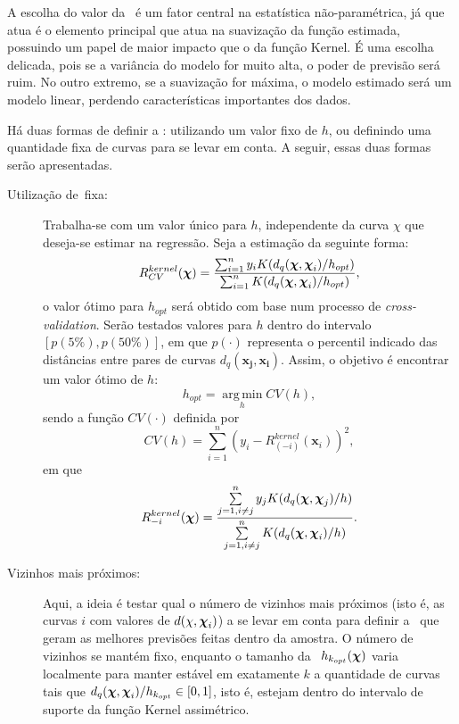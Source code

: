 \documentclass[
	12pt,				%
	openright,			%
	oneside,			%
	a4paper,			%
	english,			%
	brazil				%
	]{dissertacao-ufrgs-abntex2}
\begin{document}
A escolha do valor da \bw~é um fator central na estatística não-paramétrica, já que atua é o elemento principal que atua na suavização da função estimada, possuindo um papel de maior impacto que o da função Kernel. É uma escolha delicada, pois se a variância do modelo for muito alta, o poder de previsão será ruim. No outro extremo, se a suavização for máxima, o modelo estimado será um modelo linear, perdendo características importantes dos dados.

Há duas formas de definir a \bw: utilizando um valor fixo de $h$, ou definindo uma quantidade fixa de curvas para se levar em conta. A seguir, essas duas formas serão apresentadas.

\begin{description}

\item[Utilização de \bw \,fixa:]

Trabalha-se com um valor único para $h$, independente da curva $\chi$ que deseja-se estimar na regressão. Seja a estimação da seguinte forma:
\[
R_{CV}^{kernel}(\boldsymbol{\chi})=\dfrac{\sum_{i=1}^{n}y_{i}K(d_{q}(\boldsymbol{\chi},\boldsymbol{\chi}_{i})/h_{opt})}{\sum_{i=1}^{n}K(d_{q}(\boldsymbol{\chi},\boldsymbol{\chi}_{i})/h_{opt})},
\]
o valor ótimo para $h_{opt}$ será obtido com base num processo de \emph{cross-validation}. Serão testados valores para $h$ dentro do intervalo $[p(5\%),p(50\%)]$, em que $p(\cdot)$ representa o percentil indicado das distâncias entre pares de curvas $d_q(\boldsymbol{x_j},\boldsymbol{x_i})$. Assim, o objetivo é encontrar um valor ótimo de $h$:
\[h_{opt} = \operatorname*{arg\,min}_h CV(h),\]
sendo a função $CV(\cdot)$ definida por
\[
CV(h) = \sum \limits_{i=1}^n \left(  y_i - R_{(-i)}^{kernel}(\boldsymbol{x}_i)  \right)^2, 
\]
em que
\[
R_{-i}^{kernel}(\boldsymbol{\chi})=\frac{\sum \limits_{j=1,i \neq j}^{n}y_{j}K(d_{q}(\boldsymbol{\chi},\boldsymbol{\chi}_{j})/h)}{\sum \limits_{j=1,i \neq j}^{n}K(d_{q}(\boldsymbol{\chi},\boldsymbol{\chi}_{i})/h)}.
\]

\item[Vizinhos mais próximos:]

Aqui, a ideia é testar qual o número de vizinhos mais próximos (isto é, as curvas $i$ com valores de $d(\chi,\boldsymbol{\chi}_i)$) a se levar em conta para definir a \bw~que geram as melhores previsões feitas dentro da amostra.
O número de vizinhos se mantém fixo, enquanto o tamanho da \bw~$h_{k_{opt}}(\boldsymbol{\chi})$ varia localmente para manter estável em exatamente $k$ a quantidade de curvas tais que $d_{q}(\boldsymbol{\chi},\boldsymbol{\chi}_{i})/h_{k_{opt}} \in [0,1]$, isto é, estejam dentro do intervalo de suporte da função Kernel assimétrico.


\end{description}
\end{document}
